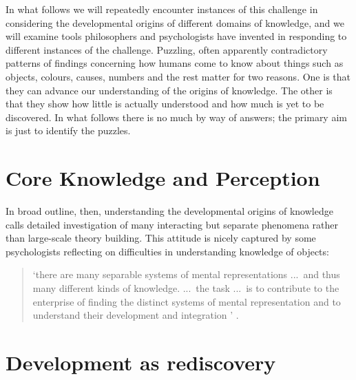 \documentclass[12pt,\papersize]{extarticle}
\begin{document}
In what follows we will repeatedly encounter instances of this challenge  in considering the developmental origins of different domains of knowledge, 
and we will examine tools philosophers and psychologists have invented in responding to different instances of the challenge.  
Puzzling, often apparently contradictory patterns of findings concerning how humans come to know about things such as objects, colours, causes, numbers and the rest matter for two reasons.
One is that they can advance our understanding of  the origins of knowledge.
The other is that they show how little is actually understood and how much is yet to be discovered.
In what follows there is no much by way of answers; the primary aim is just to identify the puzzles.




\section{Core Knowledge and Perception}


In broad outline, then, understanding the developmental origins of knowledge calls detailed investigation of many interacting but separate phenomena rather than large-scale theory building. 
This attitude is nicely captured by some psychologists reflecting on difficulties in understanding knowledge of objects:
%
\begin{quote}
`there are many separable systems of mental representations ...\ and thus many different kinds of knowledge. ...\ the task ...\ is to contribute to the enterprise of finding the distinct systems of mental representation and to understand their development and integration%
'
\citep[p.\ 1522]{Hood:2000bf}.
\end{quote}
%


\section{Development as rediscovery}
\end{document}
